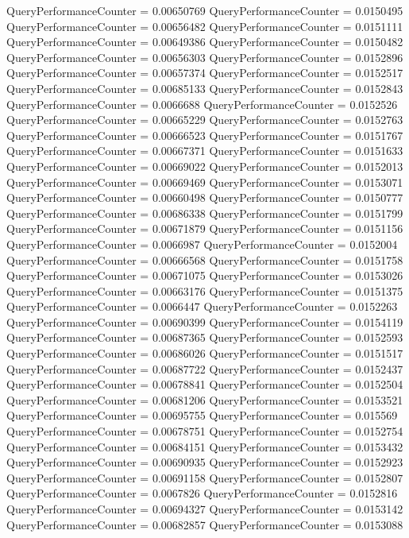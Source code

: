 \documentclass[9pt]{article}
\theoremstyle{plain}
\theoremstyle{definition}
\theoremstyle{remark}
\numberwithin{equation}{section}
\begin{document}
QueryPerformanceCounter  =  0.00650769
QueryPerformanceCounter  =  0.0150495
QueryPerformanceCounter  =  0.00656482
QueryPerformanceCounter  =  0.0151111
QueryPerformanceCounter  =  0.00649386
QueryPerformanceCounter  =  0.0150482
QueryPerformanceCounter  =  0.00656303
QueryPerformanceCounter  =  0.0152896
QueryPerformanceCounter  =  0.00657374
QueryPerformanceCounter  =  0.0152517
QueryPerformanceCounter  =  0.00685133
QueryPerformanceCounter  =  0.0152843
QueryPerformanceCounter  =  0.0066688
QueryPerformanceCounter  =  0.0152526
QueryPerformanceCounter  =  0.00665229
QueryPerformanceCounter  =  0.0152763
QueryPerformanceCounter  =  0.00666523
QueryPerformanceCounter  =  0.0151767
QueryPerformanceCounter  =  0.00667371
QueryPerformanceCounter  =  0.0151633
QueryPerformanceCounter  =  0.00669022
QueryPerformanceCounter  =  0.0152013
QueryPerformanceCounter  =  0.00669469
QueryPerformanceCounter  =  0.0153071
QueryPerformanceCounter  =  0.00660498
QueryPerformanceCounter  =  0.0150777
QueryPerformanceCounter  =  0.00686338
QueryPerformanceCounter  =  0.0151799
QueryPerformanceCounter  =  0.00671879
QueryPerformanceCounter  =  0.0151156
QueryPerformanceCounter  =  0.0066987
QueryPerformanceCounter  =  0.0152004
QueryPerformanceCounter  =  0.00666568
QueryPerformanceCounter  =  0.0151758
QueryPerformanceCounter  =  0.00671075
QueryPerformanceCounter  =  0.0153026
QueryPerformanceCounter  =  0.00663176
QueryPerformanceCounter  =  0.0151375
QueryPerformanceCounter  =  0.0066447
QueryPerformanceCounter  =  0.0152263
QueryPerformanceCounter  =  0.00690399
QueryPerformanceCounter  =  0.0154119
QueryPerformanceCounter  =  0.00687365
QueryPerformanceCounter  =  0.0152593
QueryPerformanceCounter  =  0.00686026
QueryPerformanceCounter  =  0.0151517
QueryPerformanceCounter  =  0.00687722
QueryPerformanceCounter  =  0.0152437
QueryPerformanceCounter  =  0.00678841
QueryPerformanceCounter  =  0.0152504
QueryPerformanceCounter  =  0.00681206
QueryPerformanceCounter  =  0.0153521
QueryPerformanceCounter  =  0.00695755
QueryPerformanceCounter  =  0.015569
QueryPerformanceCounter  =  0.00678751
QueryPerformanceCounter  =  0.0152754
QueryPerformanceCounter  =  0.00684151
QueryPerformanceCounter  =  0.0153432
QueryPerformanceCounter  =  0.00690935
QueryPerformanceCounter  =  0.0152923
QueryPerformanceCounter  =  0.00691158
QueryPerformanceCounter  =  0.0152807
QueryPerformanceCounter  =  0.0067826
QueryPerformanceCounter  =  0.0152816
QueryPerformanceCounter  =  0.00694327
QueryPerformanceCounter  =  0.0153142
QueryPerformanceCounter  =  0.00682857
QueryPerformanceCounter  =  0.0153088
\end{document}
